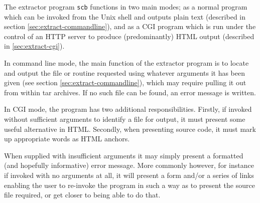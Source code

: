 \documentclass[twoside,11pt]{article}
\renewcommand{\_}{\texttt{\symbol{95}}}
\begin{document}
The extractor program {\tt scb} functions in two main modes;
as a normal program which can be invoked from the Unix shell and
outputs plain text (described in section \ref{sec:extract-commandline}),
and as a CGI program which is run under the control of an HTTP server
to produce (predominantly) HTML output (described in \ref{sec:extract-cgi}).

In command line mode, the main function of the extractor
program is to locate and output
the file or routine requested using whatever arguments it
has been given (see section \ref{sec:extract-commandline}),
which may require pulling it out from within tar archives.
If no such file can be found, an error message is written.

In CGI mode, the program has two additional responsibilities.
Firstly, if invoked without sufficient arguments to identify 
a file for output, it must present some useful alternative in HTML.
Secondly, when presenting source code, it must mark up 
appropriate words as HTML anchors.

When supplied with insufficient arguments it may simply present
a formatted (and hopefully informative) error message. 
More commonly however, for instance if invoked with no arguments
at all, it will present a form and/or a series of links 
enabling the user to re-invoke the program 
in such a way as to present the source file required,
or get closer to being able to do that.
\end{document}
